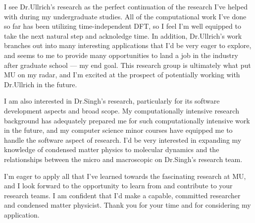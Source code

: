 \documentclass[11pt]{article}
\newcommand{\schoolabbr}{MU}
\begin{document}
I see Dr.\@ Ullrich's research as the perfect continuation of the research I've helped with during my undergraduate studies. All of the computational work I've done so far has been utilizing time-independent DFT, so I feel I'm well equipped to take the next natural step and acknoledge time. In addition, Dr.\@ Ullrich's work branches out into many interesting applications that I'd be very eager to explore, and seems to me to provide many opportunities to land a job in the industry after graduate school --- my end goal. This research group is ultimately what put MU on my radar, and I'm excited at the prospect of potentially working with Dr.\@ Ullrich in the future.

I am also interested in Dr.\@ Singh's research, particularly for its software development aspects and broad scope. My computationally intensive research background has adequately prepared me for such computationally intensive work in the future, and my computer science minor courses have equipped me to handle the software aspect of research. I'd be very interested in expanding my knowledge of condensed matter physics to molecular dynamics and the relationships between the micro and macroscopic on Dr.\@ Singh's research team.

I'm eager to apply all that I've learned towards the fascinating research at \schoolabbr{}, and I look forward to the opportunity to learn from and contribute to your research teams. I am confident that I'd make a capable, committed researcher and condensed matter physicist. Thank you for your time and for considering my application.
\end{document}
